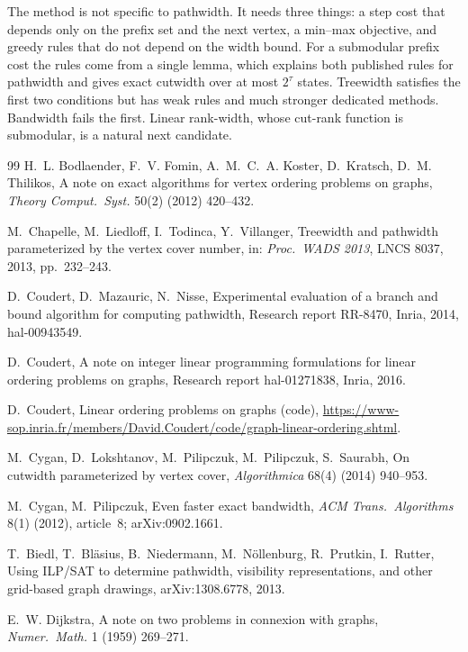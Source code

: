 \documentclass[11pt]{article}
\theoremstyle{definition}
\begin{document}
The method is not specific to pathwidth. It needs three things: a step
cost that depends only on the prefix set and the next vertex, a min--max
objective, and greedy rules that do not depend on the width bound. For a
submodular prefix cost the rules come from a single lemma, which explains
both published rules for pathwidth and gives exact cutwidth over at most
$2^{\tau}$ states. Treewidth satisfies the first two conditions but has
weak rules and much stronger dedicated methods. Bandwidth fails the first.
Linear rank-width, whose cut-rank function is submodular, is a natural next
candidate.

\begin{thebibliography}{99}
H.~L. Bodlaender, F.~V. Fomin, A.~M.~C.~A. Koster, D.~Kratsch, D.~M. Thilikos,
A note on exact algorithms for vertex ordering problems on graphs,
\emph{Theory Comput.\ Syst.} 50(2) (2012) 420--432.

M.~Chapelle, M.~Liedloff, I.~Todinca, Y.~Villanger,
Treewidth and pathwidth parameterized by the vertex cover number,
in: \emph{Proc.\ WADS 2013}, LNCS 8037, 2013, pp.~232--243.

D.~Coudert, D.~Mazauric, N.~Nisse,
Experimental evaluation of a branch and bound algorithm for computing
pathwidth,
Research report RR-8470, Inria, 2014, hal-00943549.

D.~Coudert,
A note on integer linear programming formulations for linear ordering
problems on graphs,
Research report hal-01271838, Inria, 2016.

D.~Coudert,
Linear ordering problems on graphs (code),
\url{https://www-sop.inria.fr/members/David.Coudert/code/graph-linear-ordering.shtml}.

M.~Cygan, D.~Lokshtanov, M.~Pilipczuk, M.~Pilipczuk, S.~Saurabh,
On cutwidth parameterized by vertex cover,
\emph{Algorithmica} 68(4) (2014) 940--953.

M.~Cygan, M.~Pilipczuk,
Even faster exact bandwidth,
\emph{ACM Trans.\ Algorithms} 8(1) (2012), article~8; arXiv:0902.1661.

T.~Biedl, T.~Bl\"asius, B.~Niedermann, M.~N\"ollenburg, R.~Prutkin, I.~Rutter,
Using ILP/SAT to determine pathwidth, visibility representations, and other
grid-based graph drawings, arXiv:1308.6778, 2013.

E.~W. Dijkstra,
A note on two problems in connexion with graphs,
\emph{Numer.\ Math.} 1 (1959) 269--271.


\end{thebibliography}
\end{document}
